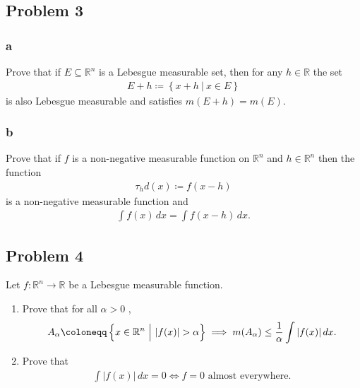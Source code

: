 \hypertarget{problem-3}{%
\subsection{Problem 3}\label{problem-3}}

\hypertarget{a}{%
\subsubsection{a}\label{a}}

Prove that if \(E \subseteq {\mathbb{R}}^n\) is a Lebesgue measurable
set, then for any \(h \in {\mathbb{R}}\) the set
\begin{align*}
E+h \coloneqq\left\{{x + h {~\mathrel{\Big|}~}x\in E }\right\}
\end{align*}
is also Lebesgue measurable and satisfies \(m(E + h) = m(E)\).

\hypertarget{b}{%
\subsubsection{b}\label{b}}

Prove that if \(f\) is a non-negative measurable function on
\({\mathbb{R}}^n\) and \(h\in {\mathbb{R}}^n\) then the function
\begin{align*}
\tau_h d(x) \coloneqq f(x-h)
\end{align*}
is a non-negative measurable function and
\begin{align*}
\int f(x) \,dx= \int f(x-h) \,dx
.\end{align*}

\hypertarget{problem-4}{%
\subsection{Problem 4}\label{problem-4}}

Let \(f: {\mathbb{R}}^n\to {\mathbb{R}}\) be a Lebesgue measurable
function.

\begin{enumerate}
\def\labelenumi{\alph{enumi}.}
\item
  Prove that for all \(\alpha> 0\) ,
  \begin{align*}
  A_ \alpha  \coloneqq\left\{{x\in {\mathbb{R}}^n {~\mathrel{\Big|}~}{\left\lvert { f(x) } \right\rvert} > \alpha}\right\} \implies m(A_ \alpha) \leq {1\over \alpha} \int {\left\lvert {f (x)} \right\rvert} \,dx
  .\end{align*}
\item
  Prove that
  \begin{align*}
  \int {\left\lvert { f(x) } \right\rvert} \,dx= 0 \iff f = 0 \text{ almost everywhere}
  .\end{align*}
\end{enumerate}

